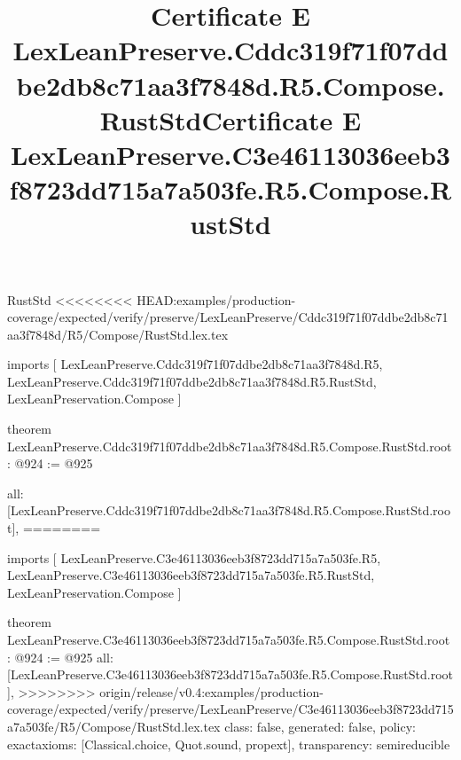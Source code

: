 \begin{lexlean}{RustStd}
<<<<<<<< HEAD:examples/production-coverage/expected/verify/preserve/LexLeanPreserve/Cddc319f71f07ddbe2db8c71aa3f7848d/R5/Compose/RustStd.lex.tex
\title{Certificate E LexLeanPreserve.Cddc319f71f07ddbe2db8c71aa3f7848d.R5.Compose.RustStd}
\begin{coremodule}
imports [
  LexLeanPreserve.Cddc319f71f07ddbe2db8c71aa3f7848d.R5,
  LexLeanPreserve.Cddc319f71f07ddbe2db8c71aa3f7848d.R5.RustStd,
  LexLeanPreservation.Compose
]

theorem LexLeanPreserve.Cddc319f71f07ddbe2db8c71aa3f7848d.R5.Compose.RustStd.root : @924 := @925 {
  all: [LexLeanPreserve.Cddc319f71f07ddbe2db8c71aa3f7848d.R5.Compose.RustStd.root],
========
\title{Certificate E LexLeanPreserve.C3e46113036eeb3f8723dd715a7a503fe.R5.Compose.RustStd}
\begin{coremodule}
imports [
  LexLeanPreserve.C3e46113036eeb3f8723dd715a7a503fe.R5,
  LexLeanPreserve.C3e46113036eeb3f8723dd715a7a503fe.R5.RustStd,
  LexLeanPreservation.Compose
]

theorem LexLeanPreserve.C3e46113036eeb3f8723dd715a7a503fe.R5.Compose.RustStd.root : @924 := @925 {
  all: [LexLeanPreserve.C3e46113036eeb3f8723dd715a7a503fe.R5.Compose.RustStd.root],
>>>>>>>> origin/release/v0.4:examples/production-coverage/expected/verify/preserve/LexLeanPreserve/C3e46113036eeb3f8723dd715a7a503fe/R5/Compose/RustStd.lex.tex
  class: false,
  generated: false,
  policy: exact{axioms: [Classical.choice, Quot.sound, propext]},
  transparency: semireducible
}


\end{coremodule}}
\end{coremodule}
\end{lexlean}

